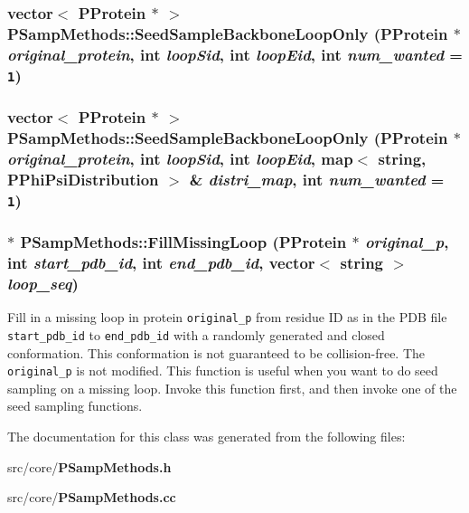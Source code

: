 \subsubsection{\setlength{\rightskip}{0pt plus 5cm}vector$<$ {\bf PProtein} $\ast$ $>$ PSamp\-Methods::Seed\-Sample\-Backbone\-Loop\-Only ({\bf PProtein} $\ast$ {\em original\_\-protein}, int {\em loop\-Sid}, int {\em loop\-Eid}, int {\em num\_\-wanted} = {\tt 1})\hspace{0.3cm}{\tt  [static]}}\label{classPSampMethods_3896a34b3e75abcb8845d236c92ca750}


\subsubsection{\setlength{\rightskip}{0pt plus 5cm}vector$<$ {\bf PProtein} $\ast$ $>$ PSamp\-Methods::Seed\-Sample\-Backbone\-Loop\-Only ({\bf PProtein} $\ast$ {\em original\_\-protein}, int {\em loop\-Sid}, int {\em loop\-Eid}, map$<$ string, {\bf PPhi\-Psi\-Distribution} $>$ \& {\em distri\_\-map}, int {\em num\_\-wanted} = {\tt 1})\hspace{0.3cm}{\tt  [static]}}\label{classPSampMethods_fd1bd616e931daf2fa4cdcd0acad21ee}


\subsubsection{ $\ast$ PSamp\-Methods::Fill\-Missing\-Loop ({\bf PProtein} $\ast$ {\em original\_\-p}, int {\em start\_\-pdb\_\-id}, int {\em end\_\-pdb\_\-id}, vector$<$ string $>$ {\em loop\_\-seq})\hspace{0.3cm}{\tt  [static]}}\label{classPSampMethods_d3b1003eaa9e09d32939b6c22f46db5e}


Fill in a missing loop in protein {\tt original\_\-p} from residue ID as in the PDB file {\tt start\_\-pdb\_\-id} to {\tt end\_\-pdb\_\-id} with a randomly generated and closed conformation. This conformation is not guaranteed to be collision-free. The {\tt original\_\-p} is not modified. This function is useful when you want to do seed sampling on a missing loop. Invoke this function first, and then invoke one of the seed sampling functions. 

The documentation for this class was generated from the following files:\begin{CompactItemize}
\item 
src/core/{\bf PSamp\-Methods.h}\item 
src/core/{\bf PSamp\-Methods.cc}\end{CompactItemize}
